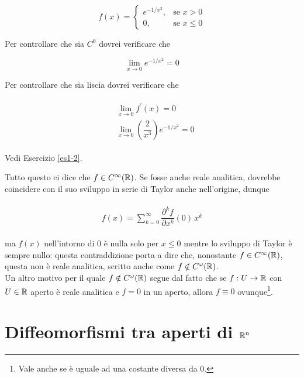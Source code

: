 \begin{equation}
	f(x) = \begin{cases}
		e^{-1/x^{2}},& \text{se } x > 0\\
		0,& \text{se } x \leqslant 0
	\end{cases}
\end{equation}

Per controllare che sia $ C^{0} $ dovrei verificare che

\begin{equation}
	\lim_{x \to 0} e^{-1/x^{2}} = 0
\end{equation}

Per controllare che sia liscia dovrei verificare che

\begin{align}
	\begin{split}
		&\lim_{x \to 0} f^{\prime} (x) = 0\\
		&\lim_{x \to 0} \left(\dfrac{2}{x^{3}}\right) e^{-1/x^{2}} = 0
	\end{split}
\end{align}

Vedi Esercizio \ref{es1-2}.

Tutto questo ci dice che $ f \in C^{\infty}(\mathbb{R}) $. Se fosse anche reale analitica, dovrebbe coincidere con il suo sviluppo in serie di Taylor anche nell'origine, dunque

\begin{align}
	\begin{split}
		f(x) = \sum_{k=0}^{\infty} \dfrac{\partial^{k} f}{\partial x^{k}} (0) \, x^{k}
	\end{split}
\end{align}

ma $ f(x) $ nell'intorno di 0 è nulla solo per $ x \leqslant 0 $ mentre lo sviluppo di Taylor è sempre nullo: questa contraddizione porta a dire che, nonostante $ f \in C^{\infty}(\mathbb{R}) $, questa non è reale analitica, scritto anche come $ f \notin C^{\omega}(\mathbb{R}) $.\\
Un altro motivo per il quale $ f \notin C^{\omega}(\mathbb{R}) $ segue dal fatto che se $ f : U \to \mathbb{R} $ con $ U \in \mathbb{R} $ aperto è reale analitica e $ f = 0 $ in un aperto, allora $ f \equiv 0 $ ovunque\footnote{%
	Vale anche se è uguale ad una costante diversa da 0.}.

\section{Diffeomorfismi tra aperti di $ \mathbb{R}^{n} $}

